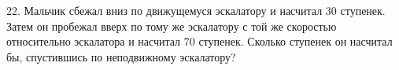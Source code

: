 22. Мальчик сбежал вниз по движущемуся эскалатору и насчитал 30 ступенек. Затем он пробежал вверх по тому же эскалатору с той же скоростью относительно эскалатора и насчитал 70 ступенек. Сколько ступенек он насчитал бы, спустившись по неподвижному эскалатору?\\
